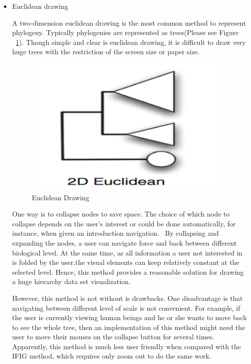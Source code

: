 \documentclass[MSc]{icldt}
\begin{document}
\begin{itemize}
  \item Euclidean drawing
 
 A two-dimension euclidean drawing is the most common method to represent phylogeny. Typically phylogenies are represented as trees(Please see Figure ~\ref{fig:eucdeanDrawing}). Though simple and clear is euclidean drawing, it is difficult to draw very huge trees with the restriction of the screen size or paper size.
  
\begin{figure}[H]
  \centering
  \includegraphics [width=10cm,height=6.8cm]{EuclideanDrawing}
  \caption{Euclidean Drawing}
  \label{fig:eucdeanDrawing}
\end{figure}
  
  One way is to collapse nodes to save space. The choice of which node to collapse depends on the user's interest or could be done automatically, for instance, when given an introduction navigation.~\cite{euclidean} By collapsing and expanding the nodes, a user can navigate force and back between different biological level. At the same time, as all information a user not interested in is folded by the user,the visual elements can keep relatively constant at the selected level. Hence, this method provides a reasonable solution for drawing a huge hierarchy data set visualization.
  
However, this method is not without is drawbacks. One disadvantage is that navigating between different level of scale is not convenient. For example, if the user is currently viewing human beings and he or she wants to move back to see the whole tree, then an implementation of this method might need the user to move their mouses on the collapse button for several times. Apparently, this method is much less user friendly when compared with the IFIG method, which requires only zoom out to do the same work.


\end{itemize}
\end{document}
